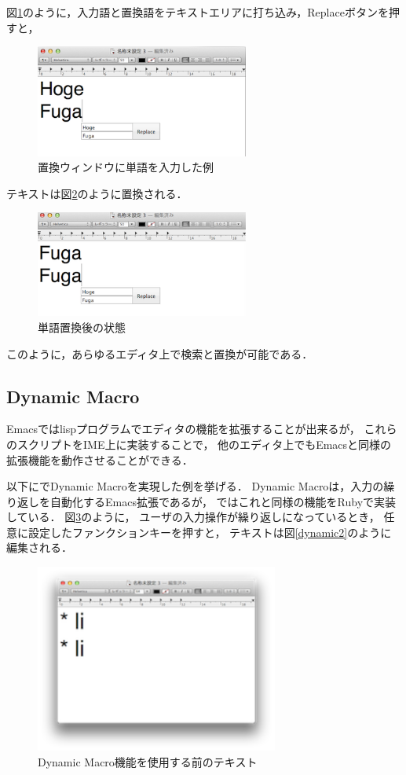 図\ref{search2}のように，入力語と置換語をテキストエリアに打ち込み，Replaceボタンを押すと，

\begin{figure}[H]
\centerline{\includegraphics[width=70mm,bb=0 0 360 191]{figures/replace2.png}}
\caption{置換ウィンドウに単語を入力した例}
\label{search2}
\end{figure}


テキストは図\ref{search3}のように置換される．

\begin{figure}[H]
\centerline{\includegraphics[width=70mm,bb=0 0 360 191]{figures/replace3.png}}
\caption{単語置換後の状態}
\label{search3}
\end{figure}

このように，あらゆるエディタ上で検索と置換が可能である．

\subsection{Dynamic Macro}

Emacsではlispプログラムでエディタの機能を拡張することが出来るが，
これらのスクリプトをIME上に実装することで，
他のエディタ上でもEmacsと同様の拡張機能を動作させることができる．

以下に{\system}でDynamic Macro\cite{DynamicMacro}を実現した例を挙げる．
Dynamic Macroは，入力の繰り返しを自動化するEmacs拡張であるが，
{\system}ではこれと同様の機能をRubyで実装している．
図\ref{dynamic1}のように，
ユーザの入力操作が繰り返しになっているとき，
任意に設定したファンクションキーを押すと，
テキストは図\ref{dynamic2}のように編集される．

\begin{figure}[H]
\centerline{\includegraphics[width=80mm,bb=0 0 360 220]{figures/dynamic1.png}}
\caption{Dynamic Macro機能を使用する前のテキスト}
\label{dynamic1}
\end{figure}

